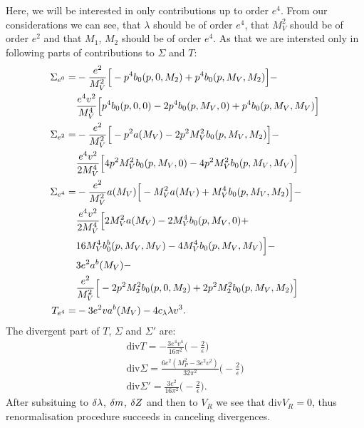 Here, we will be interested in only contributions up to order $e^4$. From our \MSbar considerations 
we can see, that $\lambda$ should be of order $e^4$, that $M_V^2$ should be of order $e^2$ and 
that $M_1$, $M_2$ should be of order $e^4$. 
As that we are 
intersted only in following parts of contributions to $\Sigma$ and $T$:
\begin{align}
\Sigma_{e^0} = &-\frac{e^2}{M_V^2}\Big[-p^4b_0(p,0,M_2)+p^4b_0(p,M_V,M_2)\Big]-\notag \\
&\frac{e^4v^2}{M_V^4}\Big[p^4b_0(p,0,0)-2p^4b_0(p,M_V,0)+p^4b_0(p,M_V,M_V)\Big] \\
\Sigma_{e^2} = &-\frac{e^2}{M_V^2}\Big[-p^2a(M_V)-2p^2M_V^2b_0(p,M_V,M_2)\Big]-\notag \\
&\frac{e^4v^2}{2M_V^4}\Big[4p^2M_V^2b_0(p,M_V,0)-4p^2M_V^2b_0(p,M_V,M_V)\Big] \\
\Sigma_{e^4} = &-\frac{e^2}{M_V^2}a(M_V)\Big[-M_V^2a(M_V)+M_V^4b_0(p,M_V,M_2)\Big]-\notag \\
&\frac{e^4v^2}{2M_V^4}\Big[2M_V^2a(M_V)-2M_V^4b_0(p,M_V,0)+\notag \\
&16M_V^4b_0^b(p,M_V,M_V)-4M_V^4b_0(p,M_V,M_V)\Big]-\notag\\
&3e^2a^b(M_V)-\notag\\
&\frac{e^2}{M_V^2}\Big[-2p^2M_2^2b_0(p,0,M_2)+2p^2M_2^2b_0(p,M_V,M_2)\Big] \\
T_{e^4} = & -3e^2va^b(M_V)-4c_\lambda\lambda v^3.
\end{align}
The divergent part of $T$, $\Sigma$ and $\Sigma'$ are:
\begin{align}
\textrm{div}T = -\frac{3e^4v^4}{16\pi^2}\Big(-\frac{2}{\epsilon}\Big)\\
\textrm{div}\Sigma = \frac{6e^2(M_P^2-3e^2v^2)}{32\pi^2}\Big(-\frac{2}{\epsilon}\Big)\\
\textrm{div}\Sigma' = \frac{3e^2}{16\pi^2}\Big(-\frac{2}{\epsilon}\Big).
\end{align}
After subsituing to $\delta\lambda$, $\delta m$, $\delta Z$ and then to $V_R$ we see that $\textrm{div}V_R = 0$, 
thus renormalisation procedure succeeds in canceling divergences.

